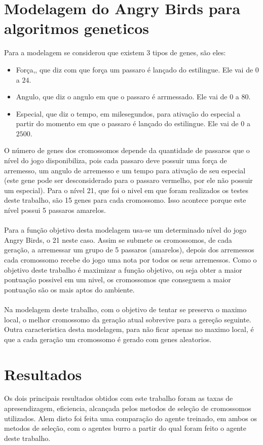 \documentclass[10pt,a4paper]{article}
\begin{document}
\section{Modelagem do Angry Birds para algoritmos geneticos}
\label{sec:modelagem}
Para a modelagem se considerou que existem 3 tipos de genes, são eles:
\begin{itemize}
  \item Força,, que diz com que força um passaro é lançado do estilingue. Ele vai de  $0$ a $24$.
  \item Angulo,  que diz o angulo em que o passaro é arrmessado. Ele vai de  $0$ a $80$.
  \item Especial, que diz o tempo, em milesegundos, para ativação do especial a partir do momento em que o passaro é lançado do estilingue. Ele vai de  $0$ a $2500$.
\end{itemize}
O número de genes dos cromossomos depende da quantidade de passaros que o nível do jogo disponibiliza, pois cada passaro deve possuir uma força de arremesso, um angulo de arremesso e um tempo para ativação de seu especial (este gene pode ser desconsiderado para o passaro vermelho, por ele não possuir um especial). Para o nível 21, que foi o nivel em que foram realizados os testes deste trabalho, são 15 genes para cada cromossomo. Isso acontece porque este  nível possui 5 passaros amarelos. \\ \\
Para a função objetivo desta modelagem usa-se um determinado nível do jogo Angry Birds, o 21 neste caso. Assim se submete os cromossomos, de cada geração, a arremessar um grupo de 5 passaros (amarelos), depois dos arremessos cada cromossomo recebe do jogo uma nota por todos os seus arremessos. Como o objetivo deste trabalho é maximizar a função objetivo, ou seja obter a maior pontuação possivel em um nivel, os cromossomos que conseguem a maior pontuação são os mais aptos do ambiente. \\ \\
 Na modelagem deste trabalho, com o objetivo de tentar se preserva o maximo local, o melhor  cromossomo da geração atual sobrevive para a gereção seguinte. Outra caracteristica desta modelagem, para não ficar apenas no maximo local, é que a cada geração um cromossomo é gerado com genes aleatorios.
\section{Resultados}
Os dois principais resultados obtidos com este trabalho foram as taxas de apresendizagem, eficiencia, alcançada pelos metodos de seleção de cromossomos utilizados. Alem disto foi feita uma comparação do agente treinado, em ambos os metodos de seleção, com o agentes burro a partir do qual foram feito o agente deste trabalho. \\ \\
\end{document}

